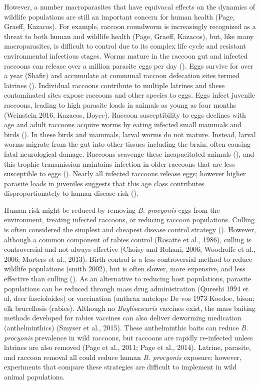 \documentclass[11pt]{article}
\begin{document}
However, a number macroparasites that have equivocal effects on the dynamics of wildlife populations are still an important concern for human health (Page, Graeff, Kazacos).  For example, raccoon roundworm is increasingly recognized as a threat to both human
and wildlife health (Page, Graeff, Kazacos), but, like many
macroparasites, is difficult to control due to its complex life cycle
and resistant environmental infectious stages. Worms mature in the
raccoon gut and infected raccoons can release over a million parasite
eggs per day (). Eggs survive for over a year (Shafir) and accumulate at
communal raccoon defecation sites termed latrines (). Individual
raccoons contribute to multiple latrines and these contaminated sites
expose raccoons and other species to eggs. Eggs infect juvenile
raccoons, leading to high parasite loads in animals as young as four
months (Weinstein 2016, Kazacos, Boyce). Raccoon susceptibility to eggs
declines with age and adult raccoons acquire worms by eating infected
small mammals and birds (). In these birds and mammals, larval worms do
not mature. Instead, larval worms migrate from the gut into other
tissues including the brain, often causing fatal neurological damage.
Raccoons scavenge these incapacitated animals (), and this trophic
transmission maintains infection in older raccoons that are less
susceptible to eggs (). Nearly all infected raccoons release eggs;
however higher parasite loads in juveniles suggests that this age class
contributes disproportionately to human disease risk ().

Human risk might be reduced by removing \emph{B. procyonis} eggs from
the environment, treating infected raccoons, or reducing raccoon
populations. Culling is often considered the simplest and cheapest
disease control strategy (). However, although a common component of
rabies control (Rosatte et al., 1986), culling is controversial and not
always effective (Choisy and Rohani, 2006; Woodroffe et al., 2006;
Morters et al., 2013). Birth control is a less controversial method to
reduce wildlife populations (smith 2002), but is often slower, more
expensive, and less effective than culling (). As an alternative to
reducing host populations, parasite populations can be reduced through
mass drug administration (Qureshi 1994 et al, deer fascioloides) or
vaccination (anthrax antelope De vos 1973 Koedoe, bison; elk brucellosis
(rabies). Although no \emph{Baylisascaris} vaccines exist, the mass
baiting methods developed for rabies vaccines can also deliver deworming
medication (anthelminthics) (Smyser et al., 2015). These anthelminthic
baits can reduce \emph{B. procyonis} prevalence in wild raccoons, but
raccoons are rapidly re-infected unless latrines are also removed (Page
et al., 2011; Page et al., 2014). Latrine, parasite, and raccoon removal
all could reduce human \emph{B. procyonis} exposure; however,
experiments that compare these strategies are difficult to implement in
wild animal populations.
\end{document}
